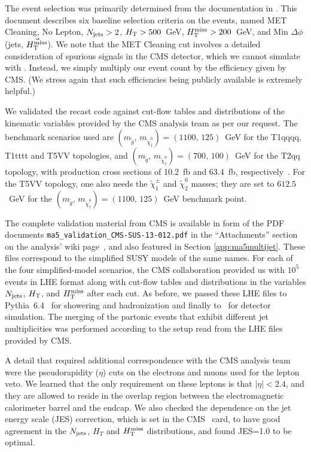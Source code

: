 The event selection was primarily determined from the documentation in \cite{Chatrchyan:2014lfa}. This document describes six baseline selection criteria on the events, named MET Cleaning, No Lepton, $N_{\rm jets}>2$, 
$H_{\rm T}>500$~GeV, $H_{\text{T}}^{\rm miss}>200$~GeV, and Min $\Delta\phi$({\rm jets}, $\vec{H_{\text{T}}^{\rm miss}}$). We note that the MET Cleaning cut involves a detailed consideration of spurious signals in the CMS detector, which we cannot simulate with \delphes. Instead, we simply multiply our event count by the efficiency given by CMS. (We stress again that such efficiencies being publicly available is extremely helpful.)

We validated the recast code against cut-flow tables and distributions of the kinematic variables provided by the CMS analysis team as per our request. The benchmark scenarios used are $(m_{\tilde g},\,m_{\tilde\chi^0_1})=(1100,\,125)$~GeV for the   T1qqqq, T1tttt and T5VV topologies, and $(m_{\tilde q},\,m_{\tilde\chi^0_1})=(700,\,100)$~GeV for the T2qq topology, 
with production cross sections of 10.2~fb and 63.4~fb, respectively~\cite{Kramer:2012bx}.  
For the T5VV topology, one also needs the $\tilde\chi^\pm_1$ and $\tilde\chi^0_2$ masses; 
they are set to $612.5$~GeV for the $(m_{\tilde g},\,m_{\tilde\chi^0_1})=(1100,\,125)$~GeV benchmark point. 

The complete validation material from CMS is available in form of the PDF documents  
\texttt{ma5\_validation\_CMS-SUS-13-012.pdf} in the ``Attachments'' section 
on the analysis' wiki page~\cite{ma5wiki}, and also featured in Section \ref{app:ma5multijet}. 
These files correspond to the simplified SUSY models of the same names.  
For each of the four simplified-model scenarios, the CMS collaboration provided us with $10^5$ events in LHE format along with cut-flow tables and distributions in the variables $N_{\rm jets}$, $H_{\rm T}$, and $H_{\text{T}}^{\rm miss}$ after each cut. As before, we passed these LHE files to {\sc Pythia}~6.4~\cite{Sjostrand:2006za} for showering and hadronization and finally to \delphes\ for detector simulation. 
The merging of the partonic events that exhibit different jet multiplicities was performed according to the setup read from the LHE files provided by CMS. 

A detail that required additional correspondence with the CMS analysis team were the pseudorapidity ($\eta$) cuts on the electrons and muons used for the lepton veto. We learned that the only requirement on these leptons is that %
$|\eta|<2.4$, and they are allowed to reside in the overlap region between the electromagnetic calorimeter barrel and the endcap.  
We also checked the dependence on the jet energy scale (JES) correction, which is set in the CMS \delphes\ card, 
to have good agreement in the $N_{\rm jets}$, $H_{T}$ and $H_{\text{T}}^{\rm miss}$ distributions, and found JES=1.0 to be optimal. 

